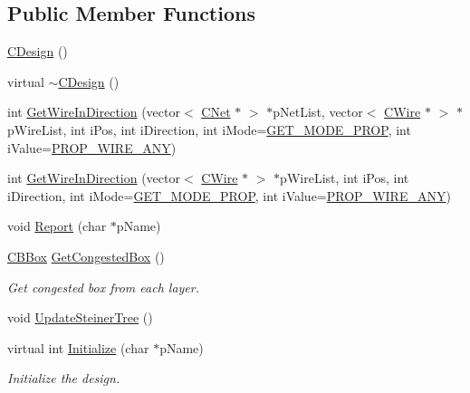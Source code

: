 \subsection*{Public Member Functions}
\begin{DoxyCompactItemize}
\item 
\mbox{\hyperlink{classCDesign_a87d140d2c8dbaa85b77f41d7724cc309}{C\+Design}} ()
\item 
virtual \mbox{\hyperlink{classCDesign_a230641b0a13390b934de6ff40b869e01}{$\sim$\+C\+Design}} ()
\item 
int \mbox{\hyperlink{classCDesign_a0b7936130fc4fb79009bfaf1df97e76e}{Get\+Wire\+In\+Direction}} (vector$<$ \mbox{\hyperlink{classCNet}{C\+Net}} $\ast$ $>$ $\ast$p\+Net\+List, vector$<$ \mbox{\hyperlink{classCWire}{C\+Wire}} $\ast$ $>$ $\ast$p\+Wire\+List, int i\+Pos, int i\+Direction, int i\+Mode=\mbox{\hyperlink{BoxRouter_8h_a678c4c2628bee05b15999bb00ded44d3}{G\+E\+T\+\_\+\+M\+O\+D\+E\+\_\+\+P\+R\+OP}}, int i\+Value=\mbox{\hyperlink{BoxRouter_8h_a3190814b5494277cd30ff3d03c8d4058}{P\+R\+O\+P\+\_\+\+W\+I\+R\+E\+\_\+\+A\+NY}})
\item 
int \mbox{\hyperlink{classCDesign_a569c1b0aa4defe50ebb89a5a4054631c}{Get\+Wire\+In\+Direction}} (vector$<$ \mbox{\hyperlink{classCWire}{C\+Wire}} $\ast$ $>$ $\ast$p\+Wire\+List, int i\+Pos, int i\+Direction, int i\+Mode=\mbox{\hyperlink{BoxRouter_8h_a678c4c2628bee05b15999bb00ded44d3}{G\+E\+T\+\_\+\+M\+O\+D\+E\+\_\+\+P\+R\+OP}}, int i\+Value=\mbox{\hyperlink{BoxRouter_8h_a3190814b5494277cd30ff3d03c8d4058}{P\+R\+O\+P\+\_\+\+W\+I\+R\+E\+\_\+\+A\+NY}})
\item 
void \mbox{\hyperlink{classCDesign_a0cbed390d0e0c05776aed59c16f7982c}{Report}} (char $\ast$p\+Name)
\item 
\mbox{\hyperlink{classCBBox}{C\+B\+Box}} \mbox{\hyperlink{classCDesign_a0ea51597e843c1f8f25dbfa4f4d4fa17}{Get\+Congested\+Box}} ()
\begin{DoxyCompactList}\small\item\em Get congested box from each layer. \end{DoxyCompactList}\item 
void \mbox{\hyperlink{classCDesign_a9571bf3353ab819782f0162867e525dc}{Update\+Steiner\+Tree}} ()
\item 
virtual int \mbox{\hyperlink{classCDesign_a9a2909717e3b6947c6d685e13088be6d}{Initialize}} (char $\ast$p\+Name)
\begin{DoxyCompactList}\small\item\em Initialize the design. \end{DoxyCompactList}\item 

\end{DoxyCompactItemize}

